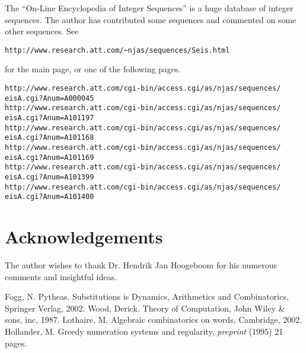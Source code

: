\documentclass{article}
\theoremstyle{definition}
\begin{document}
The ``On-Line Encyclopedia of Integer Sequences'' is a huge database of integer
sequences. The author has contributed some sequences and commented on some
other sequences. See
\begin{verbatim}
http://www.research.att.com/~njas/sequences/Seis.html
\end{verbatim}

for the main page, or one of the following pages.
\begin{verbatim}
http://www.research.att.com/cgi-bin/access.cgi/as/njas/sequences/
eisA.cgi?Anum=A000045
http://www.research.att.com/cgi-bin/access.cgi/as/njas/sequences/
eisA.cgi?Anum=A101197
http://www.research.att.com/cgi-bin/access.cgi/as/njas/sequences/
eisA.cgi?Anum=A101168
http://www.research.att.com/cgi-bin/access.cgi/as/njas/sequences/
eisA.cgi?Anum=A101169
http://www.research.att.com/cgi-bin/access.cgi/as/njas/sequences/
eisA.cgi?Anum=A101399
http://www.research.att.com/cgi-bin/access.cgi/as/njas/sequences/
eisA.cgi?Anum=A101400
\end{verbatim}

\section{Acknowledgements}
The author wishes to thank Dr. Hendrik Jan Hoogeboom for his numerous comments
and insightful ideas.


\begin{thebibliography}{XX}
 Fogg, N. Pytheas. Substitutions is Dynamics, Arithmetics and
               Combinatorics, Springer Verlag, 2002.
 Wood, Derick. Theory of Computation, John Wiley \& sons, inc, 
               1987.
 Lothaire, M. Algebraic combinatorics on words, Cambridge, 2002.
 Hollander, M. Greedy numeration systems and regularity,
              \emph{preprint} (1995) 21 pages.
\end{thebibliography}
\end{document}
